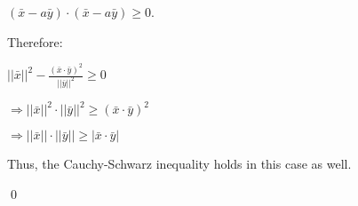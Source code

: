\begin{proofbox}
\quad $(\bar{x} - a\bar{y}) \cdot (\bar{x} - a\bar{y}) \geq 0$.

\quad Therefore:

\quad $||\bar{x}||^2 - \frac{(\bar{x} \cdot \bar{y})^2}{||\bar{y}||^2} \geq 0$

\quad $\Rightarrow ||\bar{x}||^2 \cdot ||\bar{y}||^2 \geq (\bar{x} \cdot \bar{y})^2$

\quad $\Rightarrow ||\bar{x}|| \cdot ||\bar{y}|| \geq |\bar{x} \cdot \bar{y}|$

\quad Thus, the Cauchy-Schwarz inequality holds in this case as well.

\hfill \qed

\endgroup
\end{proofbox}
